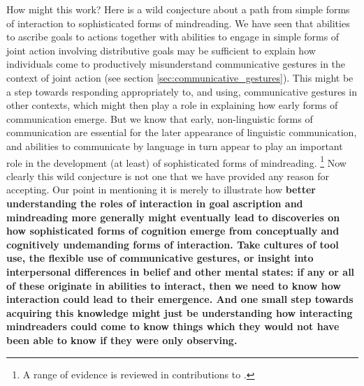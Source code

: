 \documentclass[12pt,\papersize]{extarticle}
\begin{document}
How might this work?
Here is a wild conjecture about
a path from simple forms of interaction to sophisticated forms of mindreading.
We have seen that 
	abilities to ascribe goals to actions 
 together with
	abilities to engage in simple forms of joint action involving distributive goals
 may be sufficient to explain how individuals come to productively misunderstand communicative gestures in the context of joint action (see section \vref{sec:communicative_gestures}).
This might  be a step towards responding appropriately to, and using, communicative gestures in other contexts,
which might then play a role in explaining how early forms of communication emerge.
But we know that early, non-linguistic forms of communication are essential for the later appearance of linguistic communication,
and abilities to communicate by language in turn appear to play an important role in the development (at least) of sophisticated forms of mindreading.%
\footnote{
A range of evidence is reviewed in contributions to \citet{Astington2005ot}.
}
Now clearly this wild conjecture is not one that we have provided any reason for accepting.
Our point in mentioning it is merely to illustrate how
 \textbf{better understanding the roles of interaction in goal ascription and  mindreading more generally
might eventually lead to discoveries
on how
 sophisticated forms of cognition
 emerge from
 conceptually and cognitively undemanding forms of interaction.
Take cultures of tool use,
	the flexible use of communicative gestures,
	or insight into interpersonal differences in belief and other mental states:
if any or all of these 
originate in abilities to interact,
then we need to know how interaction could lead to their emergence.
And one small step towards acquiring this knowledge might just be 
understanding how interacting mindreaders 
could 
	come to know things 
which they would not have been able to know 
if they were only observing.}



\end{document}
